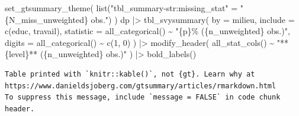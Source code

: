 \documentclass[
  letterpaper,
  DIV=11,
  numbers=noendperiod,
  oneside]{scrreprt}
\newenvironment{Shaded}{\begin{snugshade}}{\end{snugshade}}
\newcommand{\AttributeTok}[1]{\textcolor[rgb]{0.40,0.45,0.13}{#1}}
\newcommand{\DecValTok}[1]{\textcolor[rgb]{0.68,0.00,0.00}{#1}}
\newcommand{\FunctionTok}[1]{\textcolor[rgb]{0.28,0.35,0.67}{#1}}
\newcommand{\NormalTok}[1]{\textcolor[rgb]{0.00,0.23,0.31}{#1}}
\newcommand{\OtherTok}[1]{\textcolor[rgb]{0.00,0.23,0.31}{#1}}
\newcommand{\SpecialCharTok}[1]{\textcolor[rgb]{0.37,0.37,0.37}{#1}}
\newcommand{\StringTok}[1]{\textcolor[rgb]{0.13,0.47,0.30}{#1}}
\begin{document}
\begin{tcolorbox}
\begin{Shaded}
\begin{Highlighting}[]
\FunctionTok{set\_gtsummary\_theme}\NormalTok{(}
  \FunctionTok{list}\NormalTok{(}\StringTok{"tbl\_summary{-}str:missing\_stat"} \OtherTok{=} \StringTok{"\{N\_miss\_unweighted\} obs."}\NormalTok{)}
\NormalTok{)}
\NormalTok{dp }\SpecialCharTok{|\textgreater{}} 
  \FunctionTok{tbl\_svysummary}\NormalTok{(}
    \AttributeTok{by =}\NormalTok{ milieu,}
    \AttributeTok{include =} \FunctionTok{c}\NormalTok{(educ, travail),}
    \AttributeTok{statistic =} \FunctionTok{all\_categorical}\NormalTok{() }\SpecialCharTok{\textasciitilde{}} \StringTok{"\{p\}\% (\{n\_unweighted\} obs.)"}\NormalTok{,}
    \AttributeTok{digits =} \FunctionTok{all\_categorical}\NormalTok{() }\SpecialCharTok{\textasciitilde{}} \FunctionTok{c}\NormalTok{(}\DecValTok{1}\NormalTok{, }\DecValTok{0}\NormalTok{)}
\NormalTok{  ) }\SpecialCharTok{|\textgreater{}} 
  \FunctionTok{modify\_header}\NormalTok{(}
    \FunctionTok{all\_stat\_cols}\NormalTok{() }\SpecialCharTok{\textasciitilde{}} \StringTok{"**\{level\}** (\{n\_unweighted\} obs.)"}
\NormalTok{  ) }\SpecialCharTok{|\textgreater{}} 
  \FunctionTok{bold\_labels}\NormalTok{()}
\end{Highlighting}
\end{Shaded}

\begin{verbatim}
Table printed with `knitr::kable()`, not {gt}. Learn why at
https://www.danieldsjoberg.com/gtsummary/articles/rmarkdown.html
To suppress this message, include `message = FALSE` in code chunk header.
\end{verbatim}


\end{tcolorbox}
\end{document}
